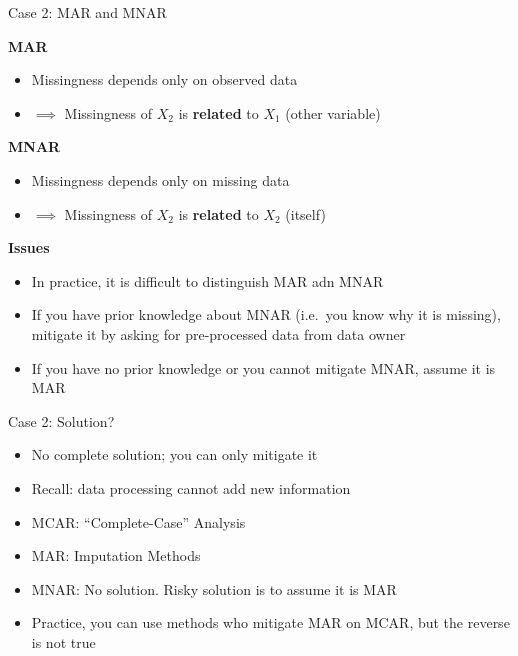\documentclass[ignorenonframetext,]{beamer}
\providecommand{\tightlist}{%
  \setlength{\itemsep}{0pt}\setlength{\parskip}{0pt}}
\begin{document}
\begin{frame}{Case 2: MAR and MNAR}

\textbf{MAR}

\begin{itemize}
\tightlist
\item
  Missingness depends only on observed data
\item
  \(\implies\) Missingness of \(X_{2}\) is \textbf{related} to \(X_{1}\)
  (other variable)
\end{itemize}

\textbf{MNAR}

\begin{itemize}
\tightlist
\item
  Missingness depends only on missing data
\item
  \(\implies\) Missingness of \(X_{2}\) is \textbf{related} to \(X_{2}\)
  (itself)
\end{itemize}

\textbf{Issues}

\begin{itemize}
\tightlist
\item
  In practice, it is difficult to distinguish MAR adn MNAR
\item
  If you have prior knowledge about MNAR (i.e.~you know why it is
  missing), mitigate it by asking for pre-processed data from data owner
\item
  If you have no prior knowledge or you cannot mitigate MNAR, assume it
  is MAR
\end{itemize}

\end{frame}

\begin{frame}{Case 2: Solution?}

\begin{itemize}
\tightlist
\item
  No complete solution; you can only mitigate it
\item
  Recall: data processing cannot add new information
\item
  MCAR: ``Complete-Case'' Analysis
\item
  MAR: Imputation Methods
\item
  MNAR: No solution. Risky solution is to assume it is MAR
\item
  Practice, you can use methods who mitigate MAR on MCAR, but the
  reverse is not true
\end{itemize}

\end{frame}
\end{document}
